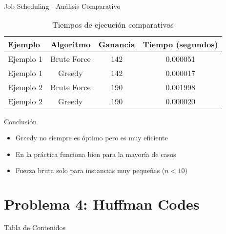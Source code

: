 \documentclass[aspectratio=169]{beamer}
\begin{document}
\begin{frame}{Job Scheduling - Análisis Comparativo}

\begin{table}
\centering
\small
\begin{tabular}{lccc}
\toprule
\textbf{Ejemplo} & \textbf{Algoritmo} & \textbf{Ganancia} & \textbf{Tiempo (segundos)} \\
\midrule
Ejemplo 1 & Brute Force & 142 & 0.000051 \\
Ejemplo 1 & Greedy & 142 & 0.000017 \\
Ejemplo 2 & Brute Force & 190 & 0.001998 \\
Ejemplo 2 & Greedy & 190 & 0.000020 \\
\bottomrule
\end{tabular}
\caption{Tiempos de ejecución comparativos}
\end{table}
    
    \begin{block}{Conclusión}
    \begin{itemize}
    \item Greedy no siempre es óptimo pero es muy eficiente
    \item En la práctica funciona bien para la mayoría de casos
    \item Fuerza bruta solo para instancias muy pequeñas ($n < 10$)
    \end{itemize}
    \end{block}
\end{frame}

\section{Problema 4: Huffman Codes}

\begin{frame}{Tabla de Contenidos}
\end{frame}
\end{document}
